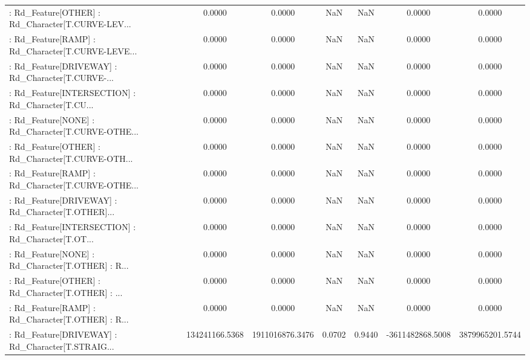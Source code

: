 \begin{longtable}{p{4cm}cccccc}
 : Rd\_Feature[OTHER] : Rd\_Character[T.CURVE-LEV... &            0.0000 &            0.0000 &     NaN &          NaN &             0.0000 &            0.0000 \\
 : Rd\_Feature[RAMP] : Rd\_Character[T.CURVE-LEVE... &            0.0000 &            0.0000 &     NaN &          NaN &             0.0000 &            0.0000 \\
 : Rd\_Feature[DRIVEWAY] : Rd\_Character[T.CURVE-... &            0.0000 &            0.0000 &     NaN &          NaN &             0.0000 &            0.0000 \\
 : Rd\_Feature[INTERSECTION] : Rd\_Character[T.CU... &            0.0000 &            0.0000 &     NaN &          NaN &             0.0000 &            0.0000 \\
 : Rd\_Feature[NONE] : Rd\_Character[T.CURVE-OTHE... &            0.0000 &            0.0000 &     NaN &          NaN &             0.0000 &            0.0000 \\
 : Rd\_Feature[OTHER] : Rd\_Character[T.CURVE-OTH... &            0.0000 &            0.0000 &     NaN &          NaN &             0.0000 &            0.0000 \\
 : Rd\_Feature[RAMP] : Rd\_Character[T.CURVE-OTHE... &            0.0000 &            0.0000 &     NaN &          NaN &             0.0000 &            0.0000 \\
 : Rd\_Feature[DRIVEWAY] : Rd\_Character[T.OTHER]... &            0.0000 &            0.0000 &     NaN &          NaN &             0.0000 &            0.0000 \\
 : Rd\_Feature[INTERSECTION] : Rd\_Character[T.OT... &            0.0000 &            0.0000 &     NaN &          NaN &             0.0000 &            0.0000 \\
 : Rd\_Feature[NONE] : Rd\_Character[T.OTHER] : R... &            0.0000 &            0.0000 &     NaN &          NaN &             0.0000 &            0.0000 \\
 : Rd\_Feature[OTHER] : Rd\_Character[T.OTHER] : ... &            0.0000 &            0.0000 &     NaN &          NaN &             0.0000 &            0.0000 \\
 : Rd\_Feature[RAMP] : Rd\_Character[T.OTHER] : R... &            0.0000 &            0.0000 &     NaN &          NaN &             0.0000 &            0.0000 \\
 : Rd\_Feature[DRIVEWAY] : Rd\_Character[T.STRAIG... &    134241166.5368 &   1911016876.3476 &  0.0702 &       0.9440 &   -3611482868.5008 &   3879965201.5744 \\

\end{longtable}
